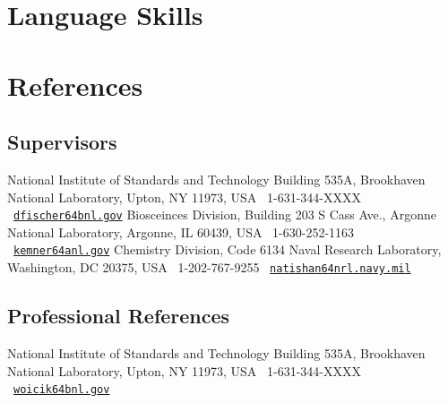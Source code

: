 \documentclass[11pt]{moderncv}
\begin{document}


\section{Language Skills}

\section{References}
\subsection{Supervisors}
%
{National Institute of Standards and Technology\newline
  Building 535A, Brookhaven National Laboratory, Upton, NY 11973, USA\newline
  \phonesymbol\ 1-631-344-XXXX\quad
  \emailsymbol\ \href{mailto:dfischer@bnl.gov}{\footnotesize\texttt{dfischer\char64bnl.gov}}}
%
{Biosceinces Division, Building 203 S Cass Ave., Argonne National Laboratory, Argonne, IL 60439, USA\newline
  \phonesymbol\ 1-630-252-1163\quad
  \emailsymbol\ \href{mailto:kemner@anl.gov}{\footnotesize\texttt{kemner\char64anl.gov}}}
%
{Chemistry Division, Code 6134\newline
  Naval Research Laboratory, Washington, DC 20375, USA\newline
  \phonesymbol\ 1-202-767-9255\quad
  \emailsymbol\ \href{mailto:natishan@nrl.navy.mil}{\footnotesize\texttt{natishan\char64nrl.navy.mil}}}

\subsection{Professional References}
%
{National Institute of Standards and Technology\newline
  Building 535A, Brookhaven National Laboratory, Upton, NY 11973, USA\newline
  \phonesymbol\ 1-631-344-XXXX\quad
  \emailsymbol\ \href{mailto:woicik@bnl.gov}{\footnotesize\texttt{woicik\char64bnl.gov}}}


\nocite{*}


\end{document}
